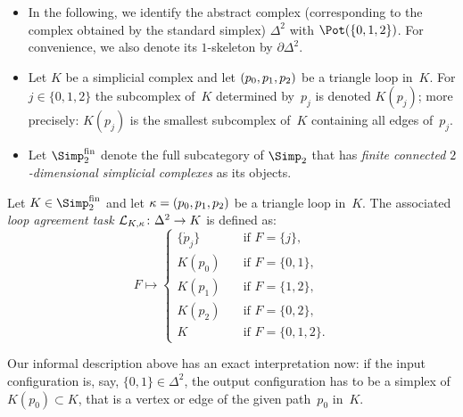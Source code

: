 \begin{thConvention}\hfill
    \begin{itemize}
        \item
            In the following, we identify the abstract complex (corresponding to
            the complex obtained by the standard simplex) $\Delta^2$ with
            $\Pot(\{0,1,2\})$.
            For convenience, we also denote its $1$-skeleton by
            $\partial\Delta^2$.
            
        \item
            Let $K$ be a simplicial complex and let $(p_0,p_1,p_2)$ be a triangle loop
            in~$K$. For $j\in\{0,1,2\}$ the subcomplex of~$K$ determined
            by~$p_j$ is denoted $K(p_j)$; more precisely: $K(p_j)$ is the
            smallest subcomplex of~$K$ containing all edges of~$p_j$.
            
        \item
            Let $\finSimp$ denote the full subcategory of $\Simp_2$ that has
            \emph{finite connected $2$-dimensional simplicial complexes} as its
            objects.
    \end{itemize}
\end{thConvention}

\begin{thDef}
    Let $K\in\finSimp$ and let $\kappa = (p_0,p_1,p_2)$ be a triangle loop in~$K$. The
    associated \emph{loop agreement task $\mathcal{L}_{K,\kappa}\colon\Delta^2 \to K$}
    is defined as:
    \[
        F \mapsto \begin{cases}
            \{\dot{p}_j\} &\quad \text{if } F = \{j\},   \\
            K(p_0)        &\quad \text{if } F = \{0,1\}, \\
            K(p_1)        &\quad \text{if } F = \{1,2\}, \\
            K(p_2)        &\quad \text{if } F = \{0,2\}, \\
            K             &\quad \text{if } F = \{0,1,2\}
        . \end{cases}
    \]
\end{thDef}

Our informal description above has an exact interpretation now: if the input
configuration is, say, $\{0,1\}\in\Delta^2$, the output configuration has to
be a simplex of $K(p_0)\subset K$, that is a vertex or edge of the given
path~$p_0$ in~$K$.

